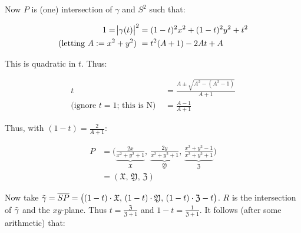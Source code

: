 \begin{center}
\end{center}




Now $P$ is (one) intersection of $\gamma$ and $S^2$ such that:

\begin{align*}
    1 = \abs{\gamma(t) }^2 &= (1-t)^2x^2 + (1-t)^2 y^2 + t^2\\
    \text{(letting $A \vcentcolon = x^2 + y^2$) } &= t^2 (A+1) - 2At + A 
\end{align*}

This is quadratic in $t$. Thus:

\begin{align*}
    t &= \frac{A \pm \sqrt{A^2 - (A^2 - 1)}}{A+1}\\ \text{(ignore $t=1$; this is N) } &= \frac{A-1}{A+1}
\end{align*}

Thus, with $(1-t) = \frac{2}{A+1}$:

\begin{align*}
    P &= \bigg( \underbrace{\frac{2x}{x^2+y^2+1} }_{\mathfrak{X}}, \,  \underbrace{\frac{2y}{x^2+y^2+1}}_{\mathfrak{Y}} , \, \underbrace{\frac{x^2+y^2-1}{x^2+y^2+1}}_{\mathfrak{Z}}  \bigg)\\
    &= \left( \mathfrak{X}, \, \mathfrak{Y}, \, \mathfrak{Z} \right)
\end{align*}

Now take $\Tilde{\gamma} = \overline{SP} = \big( (1-t) \cdot \mathfrak{X}, \, (1-t) \cdot \mathfrak{Y}, \, (1-t)\cdot \mathfrak{Z} - t \big)$. $R$ is the intersection of $\Tilde{\gamma}$ and the $xy$-plane. Thus $t = \frac{\mathfrak{Z}}{\mathfrak{Z}+1}$ and $1-t = \frac{1}{\mathfrak{Z} + 1}$. It follows (after some arithmetic) that:


